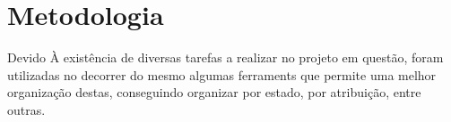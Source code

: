 
\section{Metodologia}

Devido À existência de diversas tarefas a realizar no projeto em questão, foram utilizadas no decorrer do mesmo algumas ferraments que permite uma melhor organização destas, conseguindo organizar por estado, por atribuição, entre outras.






